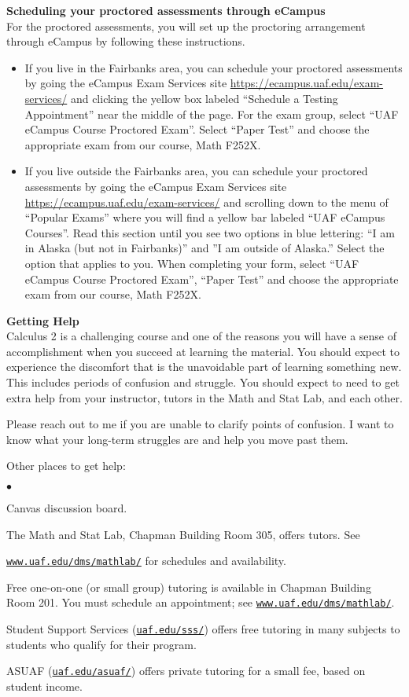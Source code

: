 \documentclass[12pt]{article}
\renewcommand{\emph}[1]{\textsf{\textbf{#1}}}
\newcommand{\localhead}[1]{\par\smallskip\textbf{#1} \smallskip\nobreak\\}%
\def\heading#1{\localhead{\large\emph{#1}}}
\newenvironment{clist}%
{\bgroup\parskip 0pt\begin{list}{$\bullet$}{\partopsep 4pt\topsep 0pt\itemsep -2pt}}%
{\end{list}\egroup}%
\begin{document}
\heading{Scheduling your proctored assessments through eCampus}
For the proctored assessments, you will set up the proctoring arrangement through eCampus by following these instructions.
\begin{itemize}
\item If you live in the Fairbanks area, you can schedule your proctored assessments by going
the eCampus Exam Services site \href{https://ecampus.uaf.edu/exam-services/}{https://ecampus.uaf.edu/exam-services/} and clicking
the yellow box labeled “Schedule a Testing Appointment” near the middle of the page.
For the exam group, select “UAF eCampus Course Proctored Exam”. Select “Paper Test”
and choose the appropriate exam from our course, Math F252X.
\item If you live outside the Fairbanks area, you can schedule your proctored assessments by
going the eCampus Exam Services site \href{https://ecampus.uaf.edu/exam-services/}{https://ecampus.uaf.edu/exam-services/} and
scrolling down to the menu of “Popular Exams” where you will find a yellow bar labeled
“UAF eCampus Courses”. Read this section until you see two options in blue lettering: “I
am in Alaska (but not in Fairbanks)” and ”I am outside of Alaska.” Select the option that
applies to you. When completing your form, select “UAF eCampus Course Proctored
Exam”, “Paper Test” and choose the appropriate exam from our course, Math F252X.
\end{itemize}
\heading{Getting Help}
Calculus 2 is a challenging course and one of the reasons you will have a sense of accomplishment when you succeed at learning the material. You should expect to experience the discomfort that is the unavoidable part of learning something new. This includes periods of confusion and struggle. You should expect to need to get extra help from your instructor, tutors in the Math and Stat Lab, and each other. 

Please reach out to me if you are unable to clarify points of confusion. I want to know what your long-term struggles are and help you move past them.

Other places to get help: 

\begin{clist}
	\item Canvas discussion board.
    	\item The Math and Stat Lab, Chapman Building Room 305, offers tutors. 
	See 

	\href{http://www.uaf.edu/dms/mathlab/}{\texttt{www.uaf.edu/dms/mathlab/}} for schedules and availability.
	\item Free
one-on-one (or small group) tutoring is available in 
Chapman Building Room 201. You must schedule an
appointment; see \href{http://www.uaf.edu/dms/mathlab/}{\texttt{www.uaf.edu/dms/mathlab/}}.
	\item Student Support Services (\href{https://uaf.edu/sss/}{\texttt{uaf.edu/sss/}}) offers free tutoring in many subjects to students who qualify for their program.
	\item ASUAF (\href{https://uaf.edu/asuaf/}{\texttt{uaf.edu/asuaf/}}) offers private tutoring for a small fee, based on student income.
\end{clist}
\end{document}
